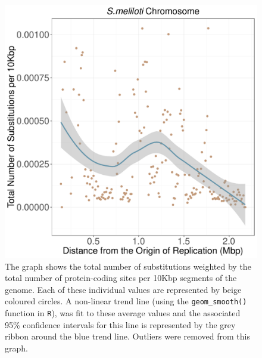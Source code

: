 \documentclass[11pt]{article}
\begin{document}
\begin{figure}[h]
	\begin{center}
		\includegraphics[width=\textwidth]{./figs/sinoC_10KB_weighted_subs_nonpar_12Sep20.pdf}
		\caption{\label{fig:sinoC_nonpar}The graph shows the total number of substitutions weighted by the total number of protein-coding sites per 10Kbp segments of the genome. Each of these individual values are represented by beige coloured circles. A non-linear trend line (using the \texttt{geom\_smooth()} function in \texttt{R}), was fit to these average values and the associated 95\% confidence intervals for this line is represented by the grey ribbon around the blue trend line. Outliers were removed from this graph.}
	\end{center}
\end{figure}
\end{document}
